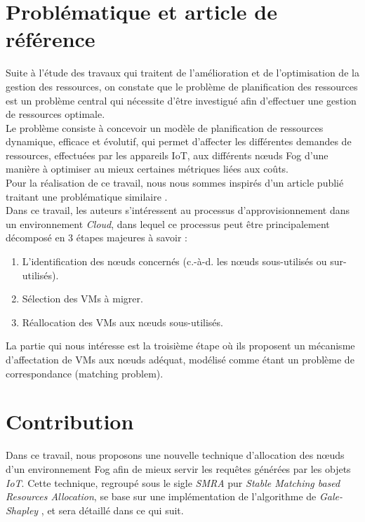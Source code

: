 \section{Problématique et article de référence}
Suite à l'étude des travaux qui traitent de l'amélioration et de l'optimisation de la gestion des ressources, on constate que le problème de planification des ressources est un problème central qui nécessite d'être investigué afin d'effectuer une gestion de ressources optimale. \\
Le problème consiste à concevoir un modèle de planification de ressources dynamique, efficace et évolutif, qui permet d'affecter les différentes demandes de ressources, effectuées par les appareils IoT, aux différents nœuds Fog d'une manière à optimiser au mieux certaines métriques liées aux coûts.\\
Pour la réalisation de ce travail, nous nous sommes inspirés d'un article publié traitant une problématique similaire \cite{jing2016}. \\
Dans ce travail, les auteurs s'intéressent au processus d'approvisionnement dans un environnement \emph{Cloud}, dans lequel ce processus peut être principalement décomposé en 3 étapes majeures à savoir : 
\begin{enumerate}
    \item L'identification des nœuds concernés (c.-à-d. les nœuds sous-utilisés ou sur-utilisés). 
    \item Sélection des VMs à migrer.
    \item Réallocation des VMs aux nœuds sous-utilisés.
\end{enumerate}
La partie qui nous intéresse est la troisième étape où ils proposent un mécanisme d'affectation de VMs aux nœuds adéquat, modélisé comme étant un problème de correspondance (matching problem).


\section{Contribution}


Dans ce travail, nous proposons une nouvelle technique d'allocation des nœuds d'un environnement Fog afin de mieux servir les requêtes générées par les objets \emph{IoT}. Cette technique, regroupé sous le sigle \emph{SMRA} pur \emph{Stable Matching based Resources Allocation}, se base sur une implémentation de l'algorithme de \emph{Gale-Shapley} \cite{gale-shapley}, et sera détaillé dans ce qui suit.\par


